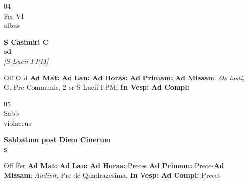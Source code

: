 \documentclass[10pt, openany]{book}
\begin{document}
    \begin{center}
        \begin{minipage}{3.5in}
            \vspace{2em}
            \begin{minipage}{0.5in}
                {\Huge 04} \\
                {\normalsize Fer VI} \\
                {\normalsize albus}
            \end{minipage}
            \begin{minipage}{3.0in}
                \textbf{ \large S Casimiri C \\
                \textnormal{\normalsize sd}} \\ \textit{[S Lucii I PM]} \\ 
            \end{minipage}
            \begin{justify}Off Ord
                \textbf{Ad Mat: }
                \textbf{Ad Lau: }
                \textbf{Ad Horas: }
                \textbf{Ad Primam: }\textbf{Ad Missam}: \textit{Os iusti,} G, Pre Communis, 2 or S Lucii I PM,  
                \textbf{In Vesp: }
                \textbf{Ad Compl: }
            \end{justify}
        \end{minipage}
    \end{center}

    \begin{center}
        \begin{minipage}{3.5in}
            \vspace{2em}
            \begin{minipage}{0.5in}
                {\Huge 05} \\
                {\normalsize Sabb} \\
                {\normalsize violaceus}
            \end{minipage}
            \begin{minipage}{3.0in}
                \textbf{ \large Sabbatum post Diem Cinerum \\
                \textnormal{\normalsize s}} \\ 
            \end{minipage}
            \begin{justify}Off Fer
                \textbf{Ad Mat: }
                \textbf{Ad Lau: }
                \textbf{Ad Horas: }Preces
                \textbf{Ad Primam: }Preces\textbf{Ad Missam}: \textit{Audivit,} Pre de Quadragesima,  
                \textbf{In Vesp: }
                \textbf{Ad Compl: }Preces
            \end{justify}
        \end{minipage}
    \end{center}
\end{document}
